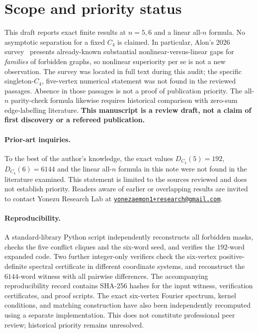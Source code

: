 \documentclass[11pt,a4paper]{article}
\begin{document}
\section{Scope and priority status}
This draft reports exact finite results at $n=5,6$ and a linear all-$n$ formula. No asymptotic separation for a fixed $C_4$ is claimed. In particular, Alon's 2026 survey~\cite{Alon2026} presents already-known substantial nonlinear-versus-linear gaps for \emph{families} of forbidden graphs, so nonlinear superiority per se is not a new observation. The survey was located in full text during this audit; the specific singleton-$C_4$, five-vertex numerical statement was not found in the reviewed passages. Absence in those passages is not a proof of publication priority. The all-$n$ parity-check formula likewise requires historical comparison with zero-sum edge-labelling literature. \textbf{This manuscript is a review draft, not a claim of first discovery or a refereed publication.}

\paragraph{Prior-art inquiries.}
To the best of the author's knowledge, the exact values $D_{C_4}(5)=192$, $D_{C_4}(6)=6144$ and the linear all-$n$ formula in this note were not found in the literature examined. This statement is limited to the sources reviewed and does not establish priority. Readers aware of earlier or overlapping results are invited to contact Yonezu Research Lab at \href{mailto:yonezaemon1+research@gmail.com}{\texttt{yonezaemon1+research@gmail.com}}.

\paragraph{Reproducibility.}
A standard-library Python script independently reconstructs all forbidden masks, checks the five conflict cliques and the six-word seed, and verifies the $192$-word expanded code. Two further integer-only verifiers check the six-vertex positive-definite spectral certificate in different coordinate systems, and reconstruct the $6144$-word witness with all pairwise differences. The accompanying reproducibility record contains SHA-256 hashes for the input witness, verification certificates, and proof scripts. The exact six-vertex Fourier spectrum, kernel conditions, and matching construction have also been independently recomputed using a separate implementation. This does not constitute professional peer review; historical priority remains unresolved.
\end{document}
